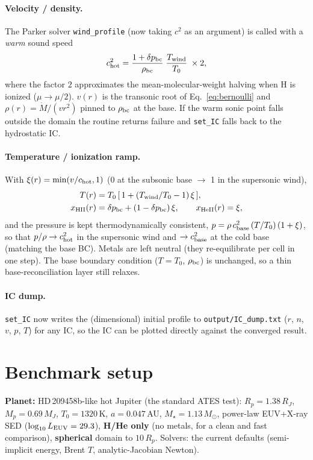 \documentclass[english,a4paper]{my_memo}
\begin{document}
\paragraph{Velocity / density.} The Parker solver \texttt{wind\_profile} (now taking
$c^2$ as an argument) is called with a \emph{warm} sound speed
\begin{equation}
  c^2_{\rm hot} = \frac{1+\delta p_{\rm bc}}{\rho_{\rm bc}}\;\frac{T_{\rm wind}}{T_0}\;\times 2 ,
\end{equation}
where the factor $2$ approximates the mean-molecular-weight halving when H is
ionized ($\mu\!\to\!\mu/2$). $v(r)$ is the transonic root of
Eq.~\ref{eq:bernoulli} and $\rho(r)=\dot M/(v r^2)$ pinned to $\rho_{\rm bc}$ at the
base. If the warm sonic point falls outside the domain the routine returns failure
and \texttt{set\_IC} falls back to the hydrostatic IC.

\paragraph{Temperature / ionization ramp.} With $\xi(r)=\min(v/c_{\rm hot},1)$ (0 at
the subsonic base $\to$ 1 in the supersonic wind),
\begin{align}
  T(r) &= T_0\,[\,1 + (T_{\rm wind}/T_0 - 1)\,\xi\,], \\
  x_{\rm HII}(r) &= \delta p_{\rm bc} + (1-\delta p_{\rm bc})\,\xi, \qquad
  x_{\rm HeII}(r) = \xi ,
\end{align}
and the pressure is kept thermodynamically consistent,
$p = \rho\,c^2_{\rm base}\,(T/T_0)\,(1+\xi)$, so that $p/\rho\to c^2_{\rm hot}$ in the
supersonic wind and $\to c^2_{\rm base}$ at the cold base (matching the base BC).
Metals are left neutral (they re-equilibrate per cell in one step). The base
boundary condition ($T=T_0$, $\rho_{\rm bc}$) is unchanged, so a thin
base-reconciliation layer still relaxes.

\paragraph{IC dump.} \texttt{set\_IC} now writes the (dimensional) initial profile
to \texttt{output/IC\_dump.txt} ($r$, $n$, $v$, $p$, $T$) for any IC, so the IC can
be plotted directly against the converged result.

\section{Benchmark setup}
\textbf{Planet:} HD\,209458b-like hot Jupiter (the standard ATES test): $R_p=1.38\,R_J$,
$M_p=0.69\,M_J$, $T_0=1320$\,K, $a=0.047$\,AU, $M_\star=1.13\,M_\odot$, power-law
EUV+X-ray SED ($\log_{10}L_{\rm EUV}=29.3$), \textbf{H/He only} (no metals, for a
clean and fast comparison), \textbf{spherical} domain to $10\,R_p$. Solvers: the
current defaults (semi-implicit energy, Brent $T$, analytic-Jacobian Newton).
\end{document}
